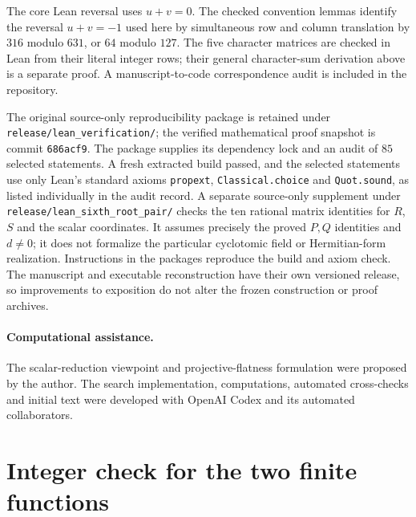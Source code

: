 \documentclass[10pt]{article}
\begin{document}
The core Lean reversal uses $u+v=0$. The checked convention lemmas
identify the reversal $u+v=-1$ used here by simultaneous row and column
translation by $316$ modulo $631$, or $64$ modulo $127$.
The five character matrices are checked in Lean from their literal integer
rows; their general character-sum derivation above is a separate proof.
A manuscript-to-code correspondence audit is included in the repository.

The original source-only reproducibility package is retained under
\texttt{release/lean\_verification/}; the verified mathematical proof
snapshot is commit \texttt{686acf9}. The package supplies its dependency
lock and an audit of $85$ selected statements. A fresh extracted build
passed, and the selected statements use only Lean's standard axioms
\texttt{propext}, \texttt{Classical.choice} and \texttt{Quot.sound},
as listed individually in the audit record. A separate source-only
supplement under \texttt{release/lean\_sixth\_root\_pair/} checks the ten
rational matrix identities for $R$, $S$ and the scalar coordinates.
It assumes precisely the proved $P,Q$ identities and $d\ne0$; it does not
formalize the particular cyclotomic field or Hermitian-form realization.
Instructions in the packages
reproduce the build and axiom check. The manuscript and executable
reconstruction have their own versioned release, so improvements to
exposition do not alter the frozen construction or proof archives.

\paragraph{Computational assistance.}
The scalar-reduction viewpoint and projective-flatness formulation were
proposed by the author. The search implementation, computations, automated
cross-checks and initial text were developed with OpenAI Codex and its
automated collaborators.


\appendix
\section{Integer check for the two finite functions}\label{app:integer}
\end{document}
